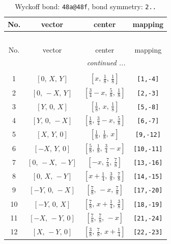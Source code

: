 \documentclass[fleqn,8pt]{jsarticle}
\begin{document}
\begin{longtable}{cccc}
\caption{Wyckoff bond: {\tt 48a@48f}, bond symmetry: {\tt 2..}}
 \\
 \hline \hline
No. & vector & center & mapping \\ \hline \endfirsthead

\multicolumn{3}{l}{\tablename\ \thetable{}} \\
 \hline \hline
No. & vector & center & mapping \\ \hline \endhead

 \hline \hline
\multicolumn{3}{r}{\footnotesize\it continued ...} \\ \endfoot

 \hline \hline
\multicolumn{3}{r}{} \\ \endlastfoot

1 & $\left[ 0,\, X,\, Y \right]$ & $\left[ x,\, \frac{1}{8},\, \frac{1}{8} \right]$ & {\tt [1,-4]} \\ \hline
2 & $\left[ 0,\, - X,\, Y \right]$ & $\left[ \frac{3}{4} - x,\, \frac{5}{8},\, \frac{1}{8} \right]$ & {\tt [2,-3]} \\ \hline
3 & $\left[ Y,\, 0,\, X \right]$ & $\left[ \frac{1}{8},\, x,\, \frac{1}{8} \right]$ & {\tt [5,-8]} \\ \hline
4 & $\left[ Y,\, 0,\, - X \right]$ & $\left[ \frac{1}{8},\, \frac{3}{4} - x,\, \frac{5}{8} \right]$ & {\tt [6,-7]} \\ \hline
5 & $\left[ X,\, Y,\, 0 \right]$ & $\left[ \frac{1}{8},\, \frac{1}{8},\, x \right]$ & {\tt [9,-12]} \\ \hline
6 & $\left[ - X,\, Y,\, 0 \right]$ & $\left[ \frac{5}{8},\, \frac{1}{8},\, \frac{3}{4} - x \right]$ & {\tt [10,-11]} \\ \hline
7 & $\left[ 0,\, - X,\, - Y \right]$ & $\left[ - x,\, \frac{7}{8},\, \frac{7}{8} \right]$ & {\tt [13,-16]} \\ \hline
8 & $\left[ 0,\, X,\, - Y \right]$ & $\left[ x + \frac{1}{4},\, \frac{3}{8},\, \frac{7}{8} \right]$ & {\tt [14,-15]} \\ \hline
9 & $\left[ - Y,\, 0,\, - X \right]$ & $\left[ \frac{7}{8},\, - x,\, \frac{7}{8} \right]$ & {\tt [17,-20]} \\ \hline
10 & $\left[ - Y,\, 0,\, X \right]$ & $\left[ \frac{7}{8},\, x + \frac{1}{4},\, \frac{3}{8} \right]$ & {\tt [18,-19]} \\ \hline
11 & $\left[ - X,\, - Y,\, 0 \right]$ & $\left[ \frac{7}{8},\, \frac{7}{8},\, - x \right]$ & {\tt [21,-24]} \\ \hline
12 & $\left[ X,\, - Y,\, 0 \right]$ & $\left[ \frac{3}{8},\, \frac{7}{8},\, x + \frac{1}{4} \right]$ & {\tt [22,-23]} \\
\end{longtable}
\end{document}
